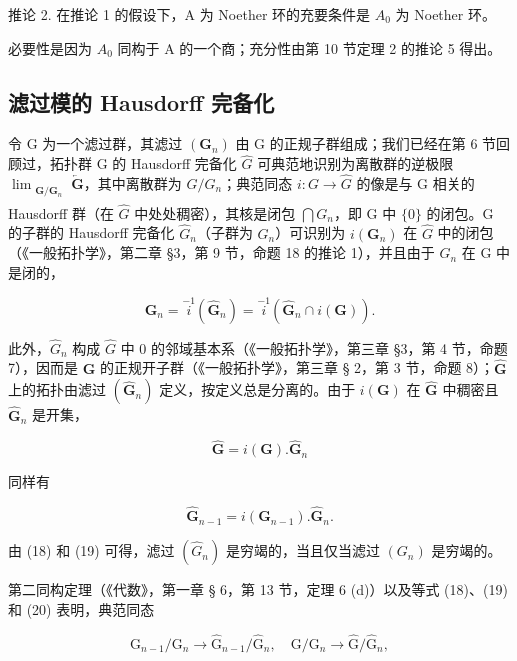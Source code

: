 	推论 2. 在推论 1 的假设下，A 为 Noether 环的充要条件是 \(A_{0}\) 为 Noether 环。

	必要性是因为 \(A_{0}\) 同构于 A 的一个商；充分性由第 10 节定理 2 的推论 5 得出。

\subsection{滤过模的 Hausdorff 完备化}

令 G 为一个滤过群，其滤过 \((\mathbf{G}_{n})\) 由 G 的正规子群组成；我们已经在第 6 节回顾过，拓扑群 G 的 Hausdorff 完备化 \(\hat{G}\) 可典范地识别为离散群的逆极限 \(\lim_{\substack{\mathbf{G}/\mathbf{G}_{n}\\ }} \overleftarrow{\mathbf{G}}\)，其中离散群为 \(G/G_{n}\)；典范同态 \(i: G \to \hat{G}\) 的像是与 G 相关的 Hausdorff 群（在 \(\hat{G}\) 中处处稠密），其核是闭包 \(\bigcap G_{n}\)，即 G 中 \(\{0\}\) 的闭包。G 的子群的 Hausdorff 完备化 \(\hat{G}_{n}\)（子群为 \(G_{n}\)）可识别为 \(i(\mathbf{G}_{n})\) 在 \(\hat{G}\) 中的闭包（《一般拓扑学》，第二章 §3，第 9 节，命题 18 的推论 1），并且由于 \(G_{n}\) 在 G 中是闭的，


\[
\mathbf {G} _ {n} = \stackrel {- 1} {i} (\hat {\mathbf {G}} _ {n}) = \stackrel {- 1} {i} (\hat {\mathbf {G}} _ {n} \cap i (\mathbf {G})).\tag{18}
\]

此外，\(\hat{G}_n\) 构成 \(\hat{G}\) 中 0 的邻域基本系（《一般拓扑学》，第三章 §3，第 4 节，命题 7），因而是 \(\hat{\mathbf{G}}\) 的正规开子群（《一般拓扑学》，第三章 § 2，第 3 节，命题 8）；\(\hat{\mathbf{G}}\) 上的拓扑由滤过 \((\hat{\mathbf{G}}_n)\) 定义，按定义总是分离的。由于 \(i(\mathbf{G})\) 在 \(\hat{\mathbf{G}}\) 中稠密且 \(\hat{\mathbf{G}}_n\) 是开集，

\[
\hat {\mathbf {G}} = i (\mathbf {G}). \hat {\mathbf {G}} _ {n}\tag{19}
\]

同样有

\[
\hat {\mathbf {G}} _ {n - 1} = i \left(\mathbf {G} _ {n - 1}\right). \hat {\mathbf {G}} _ {n}.\tag{20}
\]

由 (18) 和 (19) 可得，滤过 \((\hat{G}_n)\) 是穷竭的，当且仅当滤过 \((G_n)\) 是穷竭的。

第二同构定理（《代数》，第一章 § 6，第 13 节，定理 6 (d)）以及等式 (18)、(19) 和 (20) 表明，典范同态

\[
\mathrm{G} _ {n - 1} / \mathrm{G} _ {n} \rightarrow \hat {\mathrm{G}} _ {n - 1} / \hat {\mathrm{G}} _ {n}, \quad \mathrm{G} / \mathrm{G} _ {n} \rightarrow \hat {\mathrm{G}} / \hat {\mathrm{G}} _ {n},\tag{21}
\]

